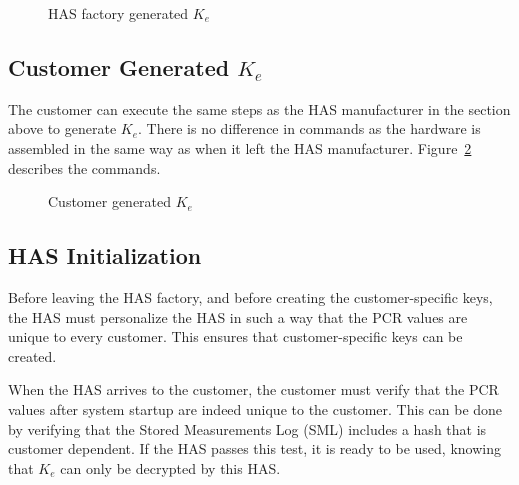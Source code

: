 {\begin{figure}[hbtp]
{
	}
	\caption{HAS factory generated $K_e$}
	\label{fig:hasgeneratedke}
\end{figure}

\subsection{Customer Generated $K_e$} \label{sec:customergeneratedke}
The customer can execute the same steps as the HAS manufacturer in the section above to generate $K_e$. There is no difference in commands as the hardware is assembled in the same way as when it left the HAS manufacturer. Figure~\ref{fig:customergeneratedke} describes the commands.
\begin{figure}[hbtp]
	\centering
	\caption{Customer generated $K_e$}
	\label{fig:customergeneratedke}
\end{figure}

\subsection{HAS Initialization}
Before leaving the HAS factory, and before creating the customer-specific keys, the HAS must personalize the HAS in such a way that the PCR values are unique to every customer. This ensures that customer-specific keys can be created.

When the HAS arrives to the customer, the customer must verify that the PCR values after system startup are indeed unique to the customer. This can be done by verifying that the Stored Measurements Log (SML) includes a hash that is customer dependent. If the HAS passes this test, it is ready to be used, knowing that $K_e$ can only be decrypted by this HAS. %

}
